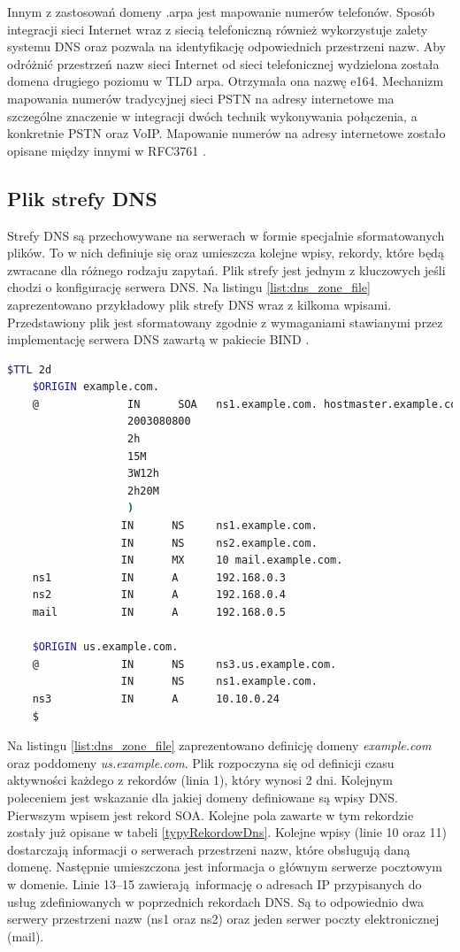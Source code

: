 Innym z zastosowań domeny .arpa jest mapowanie numerów telefonów. Sposób integracji sieci Internet wraz z siecią telefoniczną również
wykorzystuje zalety systemu DNS oraz pozwala na identyfikację odpowiednich przestrzeni nazw. Aby odróżnić przestrzeń nazw sieci
Internet od sieci telefonicznej wydzielona została domena drugiego poziomu w TLD arpa. Otrzymała ona nazwę e164. Mechanizm mapowania
numerów tradycyjnej sieci
PSTN na adresy internetowe ma szczególne znaczenie w integracji dwóch technik wykonywania połączenia, a konkretnie PSTN oraz VoIP.
Mapowanie numerów na adresy internetowe zostało opisane między innymi w RFC3761 \cite{RFC3761}.

\subsection{Plik strefy DNS}
\noindent Strefy DNS są przechowywane na serwerach w formie specjalnie sformatowanych plików. To w nich definiuje się oraz umieszcza kolejne
wpisy, rekordy, które będą zwracane dla różnego rodzaju zapytań. Plik strefy jest jednym z kluczowych jeśli chodzi o konfigurację
serwera DNS. Na listingu \ref{list:dns_zone_file} zaprezentowano przykładowy plik strefy DNS wraz z kilkoma wpisami. Przedstawiony
plik jest sformatowany zgodnie z wymaganiami stawianymi przez implementację serwera DNS zawartą w pakiecie
BIND \cite{Liu:2006:DB:1197828, isc, domain_example}.

\begin{lstlisting}[label={list:dns_zone_file},captionpos=b,caption=Przykładowy plik strefy DNS.,language=bash]
	$TTL 2d
	$ORIGIN example.com.
	@              IN      SOA   ns1.example.com. hostmaster.example.com. (
	               2003080800
	               2h
	               15M
	               3W12h
	               2h20M
	               )
	              IN      NS     ns1.example.com.
	              IN      NS     ns2.example.com.
	              IN      MX     10 mail.example.com.
	ns1           IN      A      192.168.0.3
	ns2           IN      A      192.168.0.4
	mail          IN      A      192.168.0.5

	$ORIGIN us.example.com.
	@             IN      NS     ns3.us.example.com.
	              IN      NS     ns1.example.com.
	ns3           IN      A      10.10.0.24
	$
\end{lstlisting}

Na listingu \ref{list:dns_zone_file} zaprezentowano definicję domeny \textit{example.com} oraz poddomeny \textit{us.example.com}.
Plik rozpoczyna się od definicji czasu aktywności każdego z rekordów (linia 1), który wynosi 2 dni. Kolejnym poleceniem jest
wskazanie dla jakiej domeny definiowane są wpisy DNS. Pierwszym wpisem jest rekord SOA. Kolejne pola zawarte w tym rekordzie
zostały już opisane w tabeli \ref{typyRekordowDns}. Kolejne wpisy (linie 10 oraz 11) dostarczają informacji o serwerach przestrzeni
nazw, które obsługują daną domenę. Następnie umieszczona jest informacja o głównym serwerze pocztowym w domenie. Linie 13--15
zawierają informację o adresach IP przypisanych do usług zdefiniowanych w poprzednich rekordach DNS. Są to odpowiednio dwa serwery
przestrzeni nazw (ns1 oraz ns2) oraz jeden serwer poczty elektronicznej (mail).

